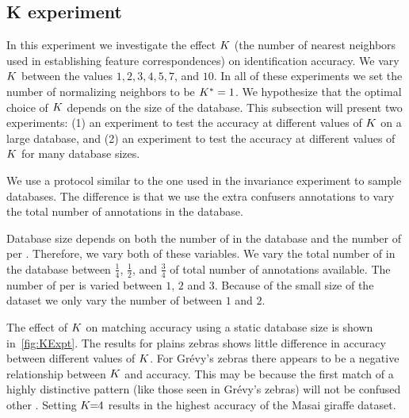     \subsection{K experiment}\label{sub:exptk}  

        In this experiment we investigate the effect $K$ (the number of nearest neighbors used in establishing
          feature correspondences) on identification accuracy.
        We vary $K$ between the values $1, 2, 3, 4, 5, 7$, and $10$.
        In all of these experiments we set the number of normalizing neighbors to be $K^{*}=1$.
        We hypothesize that the optimal choice of $K$ depends on the size of the database.
        This subsection will present two experiments:
        (1) an experiment to test the accuracy at different values of $K$ on a large database, and
        (2) an experiment to test the accuracy at different values of $K$ for many database sizes.

        We use a protocol similar to the one used in the invariance experiment to sample databases.
        The difference is that we use the extra confusers annotations to vary the total number of annotations in
          the database.

        Database size depends on both the number of \names{} in the database and the number of \exemplars{} per
          \name{}.
        Therefore, we vary both of these variables.
        We vary the total number of \exemplars{} in the database between $\frac{1}{4}$, $\frac{1}{2}$, and
          $\frac{3}{4}$ of total number of annotations available.
        The number of \exemplars{} per \name{} is varied between $1$, $2$ and $3$.
        Because of the small size of the \girmmasterI{} dataset we only vary the number of \exemplars{} between
          $1$ and $2$.

        The effect of $K$ on matching accuracy using a static database size is shown in~\cref{fig:KExpt}.
        The results for plains zebras shows little difference in accuracy between different values of $K$.
        For Grévy's zebras there appears to be a negative relationship between $K$ and accuracy.
        This may be because the first match of a highly distinctive pattern (like those seen in Grévy's zebras)
          will not be confused other \names{}.
        Setting $K\mkern-6mu=\mkern-6mu4$ results in the highest accuracy of the Masai giraffe dataset.

        \KExpt{}
        
